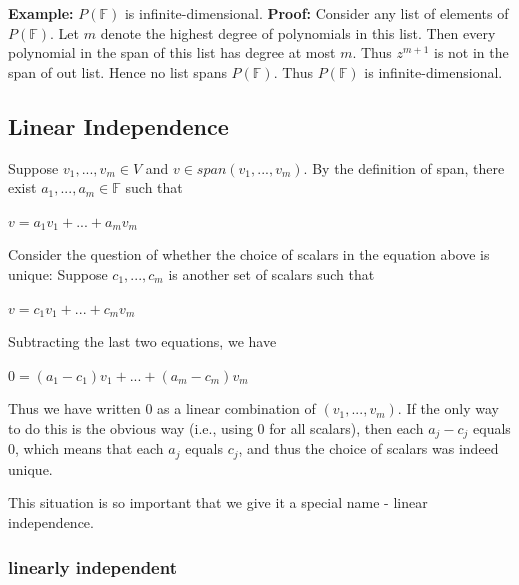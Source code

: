 \documentclass{report}
\begin{document}
\textbf{Example: } $P(\mathbb{F})$ is infinite-dimensional.\newline
\textbf{Proof: }\newline
Consider any list of elements of $P(\mathbb{F})$.\newline
Let $m$ denote the highest degree of polynomials in this list. Then every polynomial in the span of this list has degree at most $m$.\newline
Thus $z^{m+1}$ is not in the span of out list.\newline
Hence no list spans $P(\mathbb{F})$.\newline
Thus $P(\mathbb{F})$ is infinite-dimensional.

\subsection{Linear Independence}
Suppose $v_1,...,v_m \in V$ and $v \in span(v_1,...,v_m)$.\newline
By the definition of span, there exist $a_1,...,a_m \in \mathbb{F}$ such that\newline
\centerline{$v=a_1v_1+...+a_mv_m$}\newline

Consider the question of whether the choice of scalars in the equation above is unique:\newline
Suppose $c_1,...,c_m$ is another set of scalars such that\newline
\centerline{$v=c_1v_1+...+c_mv_m$}\newline\newline
Subtracting the last two equations, we have\newline
\centerline{$0=(a_1-c_1)v_1+...+(a_m-c_m)v_m$}\newline\newline
Thus we have written $0$ as a linear combination of $(v_1,...,v_m)$.\newline
If the only way to do this is the obvious way (i.e., using 0 for all scalars),\newline
then each $a_j-c_j$ equals 0, which means that each $a_j$ equals $c_j$, and thus the choice of scalars was indeed unique.\newline\newline

This situation is so important that we give it a special name - linear independence.

\subsubsection{linearly independent}
\end{document}

